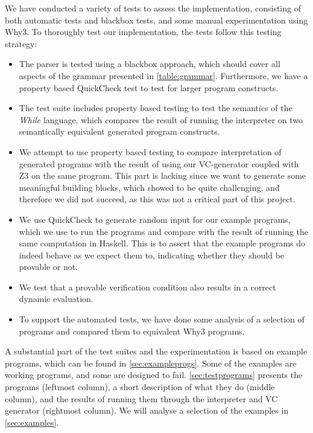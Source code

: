 
We have conducted a variety of tests to assess the implementation, consisting of both automatic tests and blackbox tests, and some manual experimentation using Why3.
To thoroughly test our implementation, the tests follow this testing strategy:
\begin{itemize}
	\item The parser is tested using a blackbox approach, which should cover all aspects of the grammar presented in \cref{table:grammar}.
  Furthermore, we have a property based QuickCheck test to test for larger program constructs.
	\item The test suite includes property based testing to test the semantics of the \textit{While} language, which compares the result of running the interpreter on two semantically equivalent generated program constructs.
	\item We attempt to use property based testing to compare interpretation of generated programs with the result of using our VC-generator coupled with Z3 on the same program. This part is lacking since we want to generate some meaningful building blocks, which showed to be quite challenging, and therefore we did not succeed, as this was not a critical part of this project.
  \item We use QuickCheck to generate random input for our example programs, which we use to run the programs and compare with the result of running the same computation in Haskell. This is to assert that the example programs do indeed behave as we expect them to, indicating whether they should be provable or not.
	\item We test that a provable verification condition also results in a correct dynamic evaluation.
  \item To support the automated tests, we have done some analysis of a selection of programs and compared them to equivalent Why3 programs.
\end{itemize}

A substantial part of the test suites and the experimentation is based on example programs, which can be found in \cref{sec:exampleprogs}.
Some of the examples are working programs, and some are designed to fail.
\cref{sec:testprograms} presents the programs (leftmost column), a short description of what they do (middle column), and the results of running them through the interpreter and VC generator (rightmost column).
We will analyse a selection of the examples in \cref{sec:examples}.

